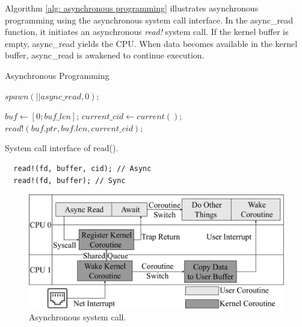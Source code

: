 \documentclass[conference]{IEEEtran}
\begin{document}
Algorithm \ref{alg: asynchronous programming} illustrates asynchronous programming using the asynchronous system call interface. In the async\_read function, it initiates an asynchronous \textit{read!} system call. If the kernel buffer is empty, async\_read yields the CPU. When data becomes available in the kernel buffer, async\_read is awakened to continue execution.

\begin{algorithm}[!h]
  \caption{Asynchronous Programming}
  \label{alg: asynchronous programming}
  \begin{algorithmic}[1]
      \State $spawn(|| async\_read, 0)$;
		\EndFunction

      \State $buf \gets [0; buf\_len]$;
      \State $current\_cid \gets current()$;
      \State $read!(buf.ptr, buf.len, current\_cid)$;
    \EndFunction
  \end{algorithmic}
\end{algorithm}

\begin{listing}
  \caption{System call interface of read().}
  \label{listing: system call}
  \begin{mdframed}
  \begin{verbatim}
  read!(fd, buffer, cid); // Async
  read!(fd, buffer); // Sync
  \end{verbatim}
  \end{mdframed}
\end{listing}

\begin{figure}[tbp]
  \centering
  \includegraphics[width=\linewidth]{assets/async_syscall.pdf}
  \caption{Asynchronous system call.}
  \label{fig:async_syscall}
  \vspace{-1em}
\end{figure}
\end{document}
